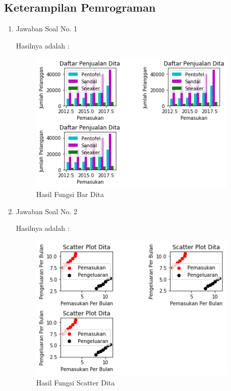 \subsection{Keterampilan Pemrograman}
\begin{enumerate}

\item Jawaban Soal No. 1

Hasilnya adalah : 
\begin{figure}[H]
	\includegraphics[width=10cm]{figures/6/1174054/Praktek/bar.png}
	\centering
	\caption{Hasil Fungsi Bar Dita}
\end{figure}

\item Jawaban Soal No. 2

Hasilnya adalah : 
\begin{figure}[H]
	\includegraphics[width=10cm]{figures/6/1174054/Praktek/scatter.png}
	\centering
	\caption{Hasil Fungsi Scatter Dita}
\end{figure}


\end{enumerate}
